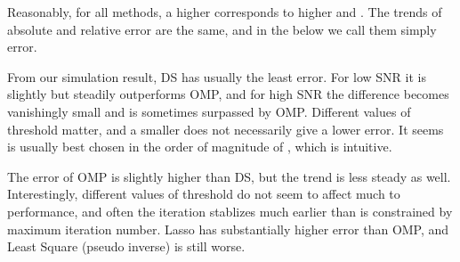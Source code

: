 
\blank [big]

\blank [big]

\blank [big]


\blank [big]

\blank [big]

\blank [big]

\stopsubsection

\startsubsection [title={Plots for \m {N_H=48}}]

\blank [big]

\blank [big]

\blank [big]



\stopsubsection

\startsubsection [title={Discussion}]

Reasonably, for all methods, a higher \m {\s} corresponds to higher  and .
The trends of absolute and relative error are the same, and in the below we call them simply error.

From our simulation result, DS has usually the least error.
For low SNR it is slightly but steadily outperforms OMP, and for high SNR the difference becomes vanishingly small and is sometimes surpassed by OMP.
Different values of threshold  matter, and a smaller  does not necessarily give a lower error.
It seems  is usually best chosen in the order of magnitude of \m {\s}, which is intuitive.

The error of OMP is slightly higher than DS, but the trend is less steady as well.
Interestingly, different values of threshold \m {\eta} do not seem to affect much to performance, and often the iteration stablizes much earlier than is constrained by maximum iteration number.
Lasso has substantially higher error than OMP, and Least Square (pseudo inverse) is still worse.


